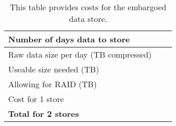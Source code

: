 \tiny \begin{longtable} {|p{}|r|l|} \caption{This table provides costs for the embargoed data store.  \label{tab:delay}}\\ 
\hline 
\textbf{Number of days data to store}& \\ \hline
{Raw data size per day (TB compressed)}& \\ \hline
{Useable size needed (TB)}& \\ \hline
{Allowing for RAID (TB)}& \\ \hline
{Cost for 1 store}& \\ \hline
\textbf{Total for 2 stores}& \\ \hline
\end{longtable} \normalsize
